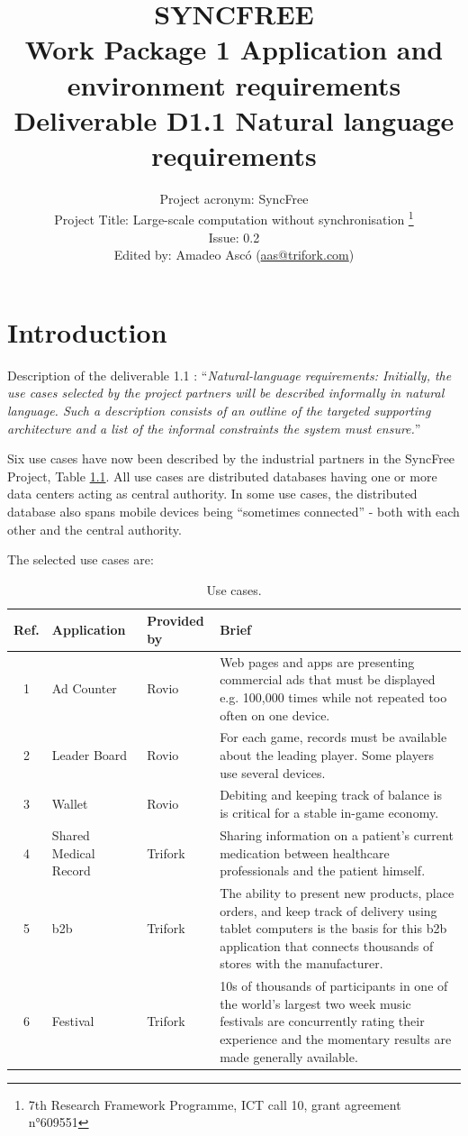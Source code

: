 \documentclass[11pt,a4paper]{report}
\title{{\Huge SYNCFREE} \\ Work Package 1 Application and environment requirements \\ Deliverable D1.1 Natural language requirements}
\author{Project acronym: SyncFree\\Project Title: Large-scale computation without synchronisation \thanks{7th Research Framework Programme, ICT call 10, grant agreement n°609551}\\Issue: 0.2\\Edited by: Amadeo Asc\'{o} (\href{mailto:aas@trifork.com}{aas@trifork.com})}
\begin{document}
\maketitle

\newpage

\tableofcontents{}

\chapter{Introduction}

Description of the deliverable 1.1 : ``{\em Natural-language
  requirements: Initially, the use cases selected by the project
  partners will be described informally in natural language. Such a
  description consists of an outline of the targeted supporting
  architecture and a list of the informal constraints the system must
  ensure.}''

Six use cases have now been described by the industrial partners in
the SyncFree Project, Table \ref{tb:use_cases}. All use cases are distributed databases having
one or more data centers acting as central authority.
In some use cases, the distributed database also spans mobile devices
being ``sometimes connected'' - both with each other and the central
authority.

The selected use cases are:
\begin{table}[htb] \centering
		\begin{tabular}{| c | l | l | p{8.5cm} |}
			\hline
			Ref. & Application & Provided by & Brief \\ \hline
			1 & Ad Counter & Rovio & Web pages and apps are presenting commercial ads that must be displayed e.g. 100,000 times while not repeated too often on one device.\\ \hline
			2 & Leader Board & Rovio & For each game, records must be available about the leading player. Some players use several devices. \\ \hline
			3 & Wallet & Rovio & Debiting and keeping track of balance is is critical for a stable in-game economy. \\ \hline
			4 & Shared Medical Record & Trifork & Sharing information on a patient's current medication between healthcare professionals and the patient himself. \\ \hline
			5 & \gls{b2b} & Trifork & The ability to present new products, place orders, and keep track of delivery using tablet computers is the basis for this \gls{b2b} application that connects thousands of stores with the manufacturer. \\ \hline
			6 & Festival & Trifork & 10s of thousands of participants in one of the world's largest two week music festivals are concurrently rating their experience and the momentary results are made generally available. \\ \hline
		\end{tabular}
		
		\caption{Use cases.}
		\label{tb:use_cases}
\end{table}
              
\end{document}
